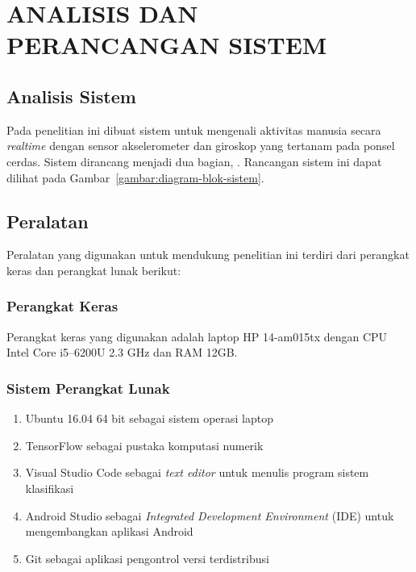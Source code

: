 \chapter{ANALISIS DAN PERANCANGAN SISTEM}


\section{Analisis Sistem}
Pada penelitian ini dibuat sistem untuk mengenali aktivitas manusia secara \textit{realtime} dengan sensor akselerometer dan giroskop yang tertanam pada ponsel cerdas. Sistem dirancang menjadi dua bagian, . Rancangan sistem ini dapat dilihat pada Gambar~\ref{gambar:diagram-blok-sistem}.


\section{Peralatan}
Peralatan yang digunakan untuk mendukung penelitian ini terdiri dari perangkat keras dan perangkat lunak berikut:

\subsection{Perangkat Keras}
Perangkat keras yang digunakan adalah laptop HP 14-am015tx dengan CPU Intel Core i5--6200U 2.3 GHz dan RAM 12GB\@.

\subsection{Sistem Perangkat Lunak}
\begin{enumerate}
    \item Ubuntu 16.04 64 bit sebagai sistem operasi laptop
    \item TensorFlow sebagai pustaka komputasi numerik
    \item Visual Studio Code sebagai \textit{text editor} untuk menulis program sistem klasifikasi
    \item Android Studio sebagai \textit{Integrated Development Environment} (IDE) untuk mengembangkan aplikasi Android
    \item Git sebagai aplikasi pengontrol versi terdistribusi
\end{enumerate}

